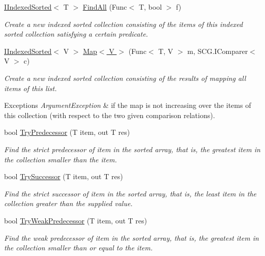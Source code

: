 \begin{DoxyCompactItemize}
\hyperlink{interface_c5_1_1_i_indexed_sorted}{I\+Indexed\+Sorted}$<$ T $>$ \hyperlink{class_c5_1_1_sorted_array_a3da344164a2fab04f46dbb519f836419}{Find\+All} (Func$<$ T, bool $>$ f)
\begin{DoxyCompactList}\small\item\em Create a new indexed sorted collection consisting of the items of this indexed sorted collection satisfying a certain predicate. \end{DoxyCompactList}\item 
\hyperlink{interface_c5_1_1_i_indexed_sorted}{I\+Indexed\+Sorted}$<$ V $>$ \hyperlink{class_c5_1_1_sorted_array_a3f64e74479636d6f0053690ce633b166}{Map$<$ V $>$} (Func$<$ T, V $>$ m, S\+C\+G.\+I\+Comparer$<$ V $>$ c)
\begin{DoxyCompactList}\small\item\em Create a new indexed sorted collection consisting of the results of mapping all items of this list. 
\begin{DoxyExceptions}{Exceptions}
{\em Argument\+Exception} & if the map is not increasing over the items of this collection (with respect to the two given comparison relations). \\
\hline
\end{DoxyExceptions}
\end{DoxyCompactList}\item 
bool \hyperlink{class_c5_1_1_sorted_array_afa5264236859d6629a4262e9f9c7af28}{Try\+Predecessor} (T item, out T res)
\begin{DoxyCompactList}\small\item\em Find the strict predecessor of item in the sorted array, that is, the greatest item in the collection smaller than the item. \end{DoxyCompactList}\item 
bool \hyperlink{class_c5_1_1_sorted_array_a6445fe3f34bb42ba79d96501b19c82c2}{Try\+Successor} (T item, out T res)
\begin{DoxyCompactList}\small\item\em Find the strict successor of item in the sorted array, that is, the least item in the collection greater than the supplied value. \end{DoxyCompactList}\item 
bool \hyperlink{class_c5_1_1_sorted_array_acf2cf7e17444a174ba50c8cbd9330d73}{Try\+Weak\+Predecessor} (T item, out T res)
\begin{DoxyCompactList}\small\item\em Find the weak predecessor of item in the sorted array, that is, the greatest item in the collection smaller than or equal to the item. \end{DoxyCompactList}\item 

\end{DoxyCompactItemize}
